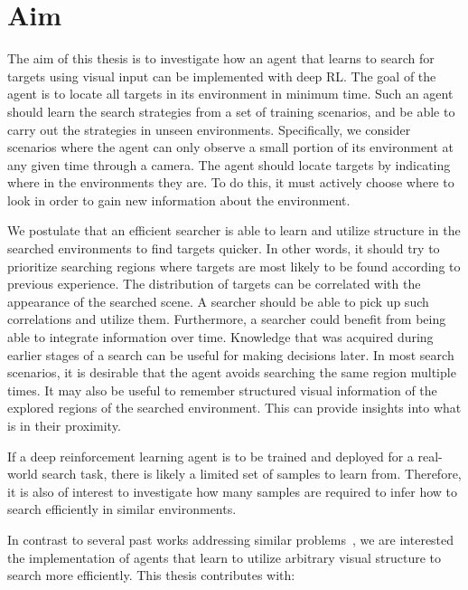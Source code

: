 \section{Aim}
\label{sec:aim}

The aim of this thesis is to investigate how an agent that learns to search for targets using visual input can be implemented with deep RL.
The goal of the agent is to locate all targets in its environment in minimum time.
Such an agent should learn the search strategies from a set of training scenarios, and be able to carry out the strategies in unseen environments.
Specifically, we consider scenarios where the agent can only observe a small portion of its environment at any given time through a camera.
The agent should locate targets by indicating where in the environments they are.
To do this, it must actively choose where to look in order to gain new information about the environment.

We postulate that an efficient searcher is able to learn and utilize structure in the searched environments to find targets quicker.
In other words, it should try to prioritize searching regions where targets are most likely to be found according to previous experience.
The distribution of targets can be correlated with the appearance of the searched scene.
A searcher should be able to pick up such correlations and utilize them.
Furthermore, a searcher could benefit from being able to integrate information over time.
Knowledge that was acquired during earlier stages of a search can be useful for making decisions later.
In most search scenarios, it is desirable that the agent avoids searching the same region multiple times.
It may also be useful to remember structured visual information of the explored regions of the searched environment.
This can provide insights into what is in their proximity.

If a deep reinforcement learning agent is to be trained and deployed for a real-world search task, there is likely a limited set of samples to learn from.
Therefore, it is also of interest to investigate how many samples are required to infer how to search efficiently in similar environments.

In contrast to several past works addressing similar problems~\cite{minut_reinforcement_2001,mirowski_learning_2017,ourselin_artificial_2016,caicedo_active_2015,shubina_visual_2010,forssen_informed_2008},
we are interested the implementation of agents that learn to utilize arbitrary visual structure to search more efficiently.
This thesis contributes with:


